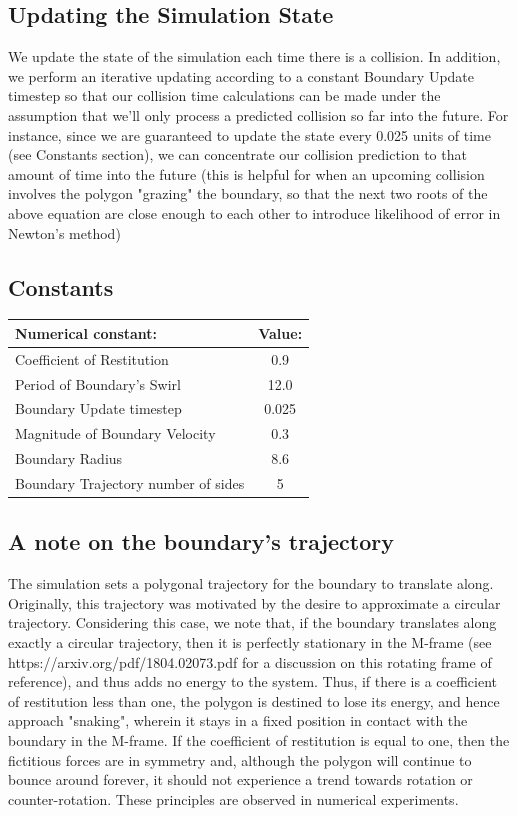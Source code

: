 \documentclass{article}
\begin{document}
\subsection*{Updating the Simulation State}
We update the state of the simulation each time there is a collision. In addition, we perform an iterative updating according to a constant Boundary Update timestep so that our collision time calculations can be made under the assumption that we'll only process a predicted collision so far into the future. For instance, since we are guaranteed to update the state every 0.025 units of time (see Constants section), we can concentrate our collision prediction to that amount of time into the future (this is helpful for when an upcoming collision involves the polygon "grazing" the boundary, so that the next two roots of the above equation are close enough to each other to introduce likelihood of error in Newton's method) 
\subsection*{Constants}
\begin{center}
  \begin{tabular}{ | l | c | }
    \hline
    Numerical constant: & Value:  \\ \hline \hline
    Coefficient of Restitution & 0.9  \\ \hline
    Period of Boundary's Swirl & 12.0  \\
    \hline
    Boundary Update timestep & 0.025 \\
    \hline
    Magnitude of Boundary Velocity & 0.3 \\ \hline Boundary Radius & 8.6 \\ \hline
    Boundary Trajectory number of sides & 5 \\ \hline
  \end{tabular}
\end{center}
\subsection*{A note on the boundary's trajectory}
The simulation sets a polygonal trajectory for the boundary to translate along. Originally, this trajectory was motivated by the desire to approximate a circular trajectory. Considering this case, we note that, if the boundary translates along exactly a circular trajectory, then it is perfectly stationary in the M-frame (see https://arxiv.org/pdf/1804.02073.pdf for a discussion on this rotating frame of reference), and thus adds no energy to the system. Thus, if there is a coefficient of restitution less than one, the polygon is destined to lose its energy, and hence approach "snaking", wherein it stays in a fixed position in contact with the boundary in the M-frame. If the coefficient of restitution is equal to one, then the fictitious forces are in symmetry and, although the polygon will continue to bounce around forever, it should not experience a trend towards rotation or counter-rotation. These principles are observed in numerical experiments. 
\end{document}
